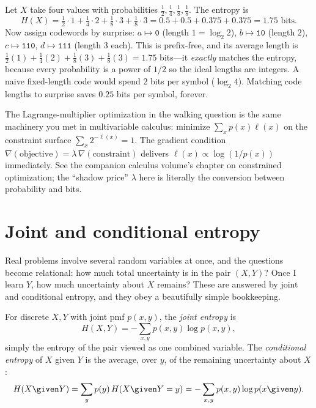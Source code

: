 \begin{example}
\label{ch33:huffman-example}
Let $X$ take four values with probabilities $\tfrac12, \tfrac14, \tfrac18, \tfrac18$. The entropy is
\[
  H(X) = \tfrac12\cdot 1 + \tfrac14\cdot 2 + \tfrac18\cdot 3 + \tfrac18\cdot 3
       = 0.5 + 0.5 + 0.375 + 0.375 = 1.75 \text{ bits.}
\]
Now assign codewords by surprise: $a \mapsto \texttt{0}$ (length $1 = \log_2 2$), $b \mapsto \texttt{10}$
(length $2$), $c \mapsto \texttt{110}$, $d \mapsto \texttt{111}$ (length $3$ each). This is prefix-free,
and its average length is $\tfrac12(1) + \tfrac14(2) + \tfrac18(3) + \tfrac18(3) = 1.75$ bits---it
\emph{exactly} matches the entropy, because every probability is a power of $1/2$ so the ideal lengths are
integers. A naive fixed-length code would spend $2$ bits per symbol ($\log_2 4$). Matching code lengths to
surprise saves $0.25$ bits per symbol, forever.
\end{example}

\begin{connectionbox}
The Lagrange-multiplier optimization in the walking question is the same machinery you met in
multivariable calculus: minimize $\sum_x p(x) \ell(x)$ on the constraint surface $\sum_x 2^{-\ell(x)} = 1$. The
gradient condition $\nabla(\text{objective}) = \lambda\,\nabla(\text{constraint})$ delivers $\ell(x) \propto
\log(1/p(x))$ immediately. See the companion calculus volume's chapter on constrained optimization; the
``shadow price'' $\lambda$ here is literally the conversion between probability and bits.
\end{connectionbox}

\section{Joint and conditional entropy}
\label{ch33:joint-conditional}

Real problems involve several random variables at once, and the questions become relational: how much
total uncertainty is in the pair $(X,Y)$? Once I learn $Y$, how much uncertainty about $X$ remains? These
are answered by joint and conditional entropy, and they obey a beautifully simple bookkeeping.

\begin{definition}
\label{ch33:def-joint-cond}
For discrete $X,Y$ with joint pmf $p(x,y)$, the \emph{joint entropy} is
\[
  H(X,Y) = -\sum_{x,y} p(x,y)\log p(x,y),
\]
simply the entropy of the pair viewed as one combined variable. The \emph{conditional entropy} of $X$
given $Y$ is the average, over $y$, of the remaining uncertainty about $X$:
\[
  H(X \given Y) = \sum_y p(y)\,H(X \given Y = y)
              = -\sum_{x,y} p(x,y)\log p(x \given y).
\]
\end{definition}

